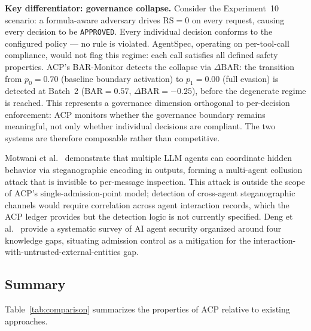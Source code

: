 \documentclass[11pt]{article}
\theoremstyle{definition}
\begin{document}
\textbf{Key differentiator: governance collapse.}
Consider the Experiment~10 scenario: a formula-aware adversary drives
$\mathrm{RS}=0$ on every request, causing every decision to be \texttt{APPROVED}.
Every individual decision conforms to the configured policy --- no rule is violated.
AgentSpec, operating on per-tool-call compliance, would not flag this regime:
each call satisfies all defined safety properties.
ACP's BAR-Monitor detects the collapse via $\Delta\mathrm{BAR}$:
the transition from $p_0=0.70$ (baseline boundary activation) to $p_1=0.00$
(full evasion) is detected at Batch~2 ($\mathrm{BAR}=0.57$, $\Delta\mathrm{BAR}=-0.25$),
before the degenerate regime is reached.
This represents a governance dimension orthogonal to per-decision enforcement:
ACP monitors whether the governance boundary remains meaningful, not only
whether individual decisions are compliant.
The two systems are therefore composable rather than competitive.

Motwani et al.~\cite{motwani2024collusion} demonstrate that multiple LLM agents can
coordinate hidden behavior via steganographic encoding in outputs, forming a
multi-agent collusion attack that is invisible to per-message inspection.
This attack is outside the scope of ACP's single-admission-point model; detection
of cross-agent steganographic channels would require correlation across agent interaction
records, which the ACP ledger provides but the detection logic is not currently specified.
Deng et al.~\cite{deng2025aiagents} provide a systematic survey of AI agent security
organized around four knowledge gaps, situating admission control as a mitigation for
the interaction-with-untrusted-external-entities gap.

\subsection{Summary}

Table~\ref{tab:comparison} summarizes the properties of ACP relative to existing approaches.
\end{document}
